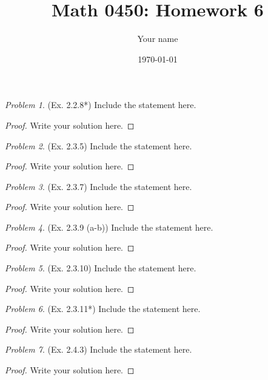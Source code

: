 \documentclass[11pt,twoside, reqno]{amsart}
\theoremstyle{remark}
\newtheorem{Prob}{Problem}
\begin{document}
\title{Math 0450: Homework 6}
\date{\today}
\author{Your name}

\maketitle

\begin{Prob}(Ex. 2.2.8*) Include the statement here.


\end{Prob}

\begin{proof}
Write your solution here.

\end{proof}

\begin{Prob}(Ex. 2.3.5)  Include the statement here.


\end{Prob}

\begin{proof}
Write your solution here.

\end{proof}

\begin{Prob}(Ex. 2.3.7)  Include the statement here.
\end{Prob}

\begin{proof}
Write your solution here.

\end{proof}


\begin{Prob}(Ex. 2.3.9 (a-b))  Include the statement here.
\end{Prob}

\begin{proof}
Write your solution here.

\end{proof}


\begin{Prob}(Ex. 2.3.10)  Include the statement here.
\end{Prob}

\begin{proof}
Write your solution here.

\end{proof}

\begin{Prob}(Ex. 2.3.11*)  Include the statement here.
\end{Prob}

\begin{proof}
Write your solution here.

\end{proof}

\begin{Prob}(Ex. 2.4.3)  Include the statement here.
\end{Prob}

\begin{proof}
Write your solution here.

\end{proof}
\end{document}
